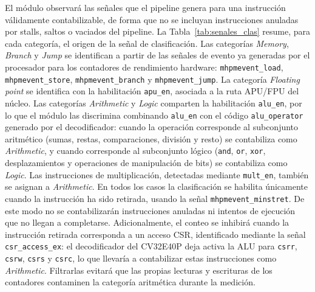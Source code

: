 El módulo observará las señales que el pipeline genera para una instrucción
válidamente contabilizable, de forma que no se incluyan instrucciones anuladas
por stalls, saltos o vaciados del pipeline. La Tabla~\ref{tab:senales_clas} resume,
para cada categoría, el origen de la señal de clasificación. Las categorías
\emph{Memory}, \emph{Branch} y \emph{Jump} se identifican a partir de las
señales de evento ya generadas por el procesador para los contadores de
rendimiento hardware: \texttt{mhpmevent\_load}, \texttt{mhpmevent\_store},
\texttt{mhpmevent\_branch} y \texttt{mhpmevent\_jump}. La categoría
\emph{Floating point} se identifica con la habilitación \texttt{apu\_en},
asociada a la ruta APU/FPU del núcleo. Las categorías \emph{Arithmetic} y
\emph{Logic} comparten la habilitación \texttt{alu\_en}, por lo que el módulo
las discrimina combinando \texttt{alu\_en} con el código \texttt{alu\_operator}
generado por el decodificador: cuando la operación corresponde al subconjunto
aritmético (sumas, restas, comparaciones, división y resto) se contabiliza
como \emph{Arithmetic}, y cuando corresponde al subconjunto lógico
(\texttt{and}, \texttt{or}, \texttt{xor}, desplazamientos y operaciones de
manipulación de bits) se contabiliza como \emph{Logic}. Las instrucciones de
multiplicación, detectadas mediante \texttt{mult\_en}, también se asignan a
\emph{Arithmetic}. En todos los casos la clasificación se habilita únicamente
cuando la instrucción ha sido retirada, usando la señal
\texttt{mhpmevent\_minstret}. De este modo no se contabilizarán instrucciones
anuladas ni intentos de ejecución que no llegan a completarse. Adicionalmente,
el conteo se inhibirá cuando la instrucción retirada corresponda a un acceso
CSR, identificado mediante la señal \texttt{csr\_access\_ex}: el decodificador
del CV32E40P deja activa la ALU para \texttt{csrr}, \texttt{csrw}, \texttt{csrs}
y \texttt{csrc}, lo que llevaría a contabilizar estas instrucciones como
\emph{Arithmetic}. Filtrarlas evitará que las propias lecturas y escrituras de
los contadores contaminen la categoría aritmética durante la medición.


